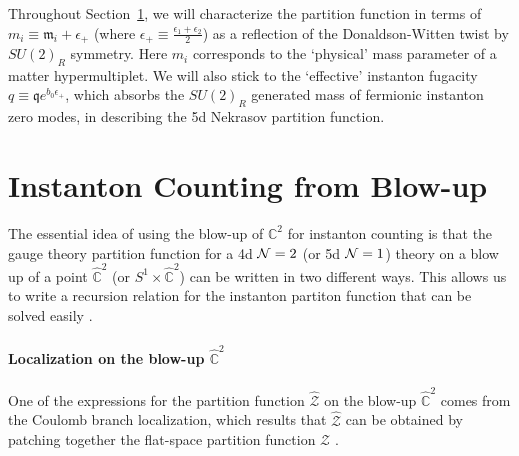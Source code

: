 \documentclass[letterpaper, 11pt]{article}
\def\IC{\mathbb{C}}
\def\CN{{\cal N}}
\begin{document}
Throughout Section~\ref{sec:blowup}, we will characterize the partition function in terms of $m_i \equiv \mathfrak{m}_i + \epsilon_+$ (where $\epsilon_+ \equiv \frac{\epsilon_1 + \epsilon_2}{2}$) as a reflection of the Donaldson-Witten twist by $SU(2)_R$ symmetry. Here $m_i$ corresponds to the `physical' mass parameter of a matter hypermultiplet. We will also stick to the `effective' instanton fugacity $q \equiv \mathfrak{q} e^{{b_0}\epsilon_+}$, which absorbs the $SU(2)_R$ generated mass of fermionic instanton zero modes, in describing the 5d Nekrasov partition function.


\section{Instanton Counting from Blow-up} \label{sec:blowup}



The essential idea of using the blow-up of ${\IC}^2$ for instanton counting is that the gauge theory partition function for a 4d $\CN=2$ (or 5d $\CN=1$) theory on a blow up of a point $\hat{\IC}^2$ (or $S^1 \times \hat{\IC}^2$) can be written in two different ways. This allows us to write a recursion relation for the instanton partiton function that can be solved easily \cite{Nakajima:2003pg, Nakajima:2003uh,Nakajima:2005fg, Keller:2012da}. 






\paragraph{Localization on the blow-up $\hat{\IC}^2$}

One of the expressions for the partition function $\hat{\mathcal{Z}}$ on the blow-up $\hat{\IC}^2$ comes from the Coulomb branch localization, which results that $\hat{\mathcal{Z}}$ can be obtained by patching together the flat-space partition function $\mathcal Z$ \cite{Nekrasov:2003vi}.
\end{document}
